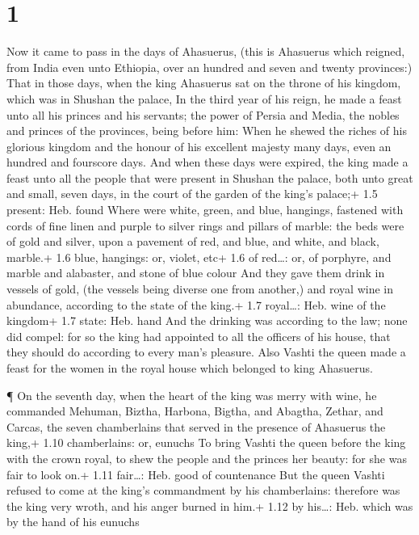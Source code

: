 \hypertarget{section}{%
\section{1}\label{section}}

 Now it came to pass in the days of Ahasuerus, (this is
Ahasuerus which reigned, from India even unto Ethiopia, over an hundred
and seven and twenty provinces:)  That in those days, when
the king Ahasuerus sat on the throne of his kingdom, which was in
Shushan the palace,  In the third year of his reign, he made
a feast unto all his princes and his servants; the power of Persia and
Media, the nobles and princes of the provinces, being before him:
 When he shewed the riches of his glorious kingdom and the
honour of his excellent majesty many days, even an hundred and fourscore
days.  And when these days were expired, the king made a
feast unto all the people that were present in Shushan the palace, both
unto great and small, seven days, in the court of the garden of the
king's palace;+ 1.5 present: Heb. found  Where were white,
green, and blue, hangings, fastened with cords of fine linen and purple
to silver rings and pillars of marble: the beds were of gold and silver,
upon a pavement of red, and blue, and white, and black, marble.+ 1.6
blue, hangings: or, violet, etc+ 1.6 of red\ldots: or, of porphyre, and
marble and alabaster, and stone of blue colour  And they
gave them drink in vessels of gold, (the vessels being diverse one from
another,) and royal wine in abundance, according to the state of the
king.+ 1.7 royal\ldots: Heb. wine of the kingdom+ 1.7 state: Heb. hand
 And the drinking was according to the law; none did compel:
for so the king had appointed to all the officers of his house, that
they should do according to every man's pleasure.  Also
Vashti the queen made a feast for the women in the royal house which
belonged to king Ahasuerus.

 ¶ On the seventh day, when the heart of the king was merry
with wine, he commanded Mehuman, Biztha, Harbona, Bigtha, and Abagtha,
Zethar, and Carcas, the seven chamberlains that served in the presence
of Ahasuerus the king,+ 1.10 chamberlains: or, eunuchs  To
bring Vashti the queen before the king with the crown royal, to shew the
people and the princes her beauty: for she was fair to look on.+ 1.11
fair\ldots: Heb. good of countenance  But the queen Vashti
refused to come at the king's commandment by his chamberlains: therefore
was the king very wroth, and his anger burned in him.+ 1.12 by
his\ldots: Heb. which was by the hand of his eunuchs

